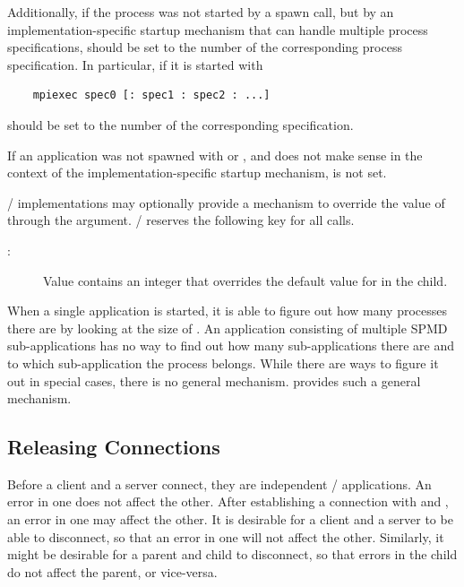 Additionally, if the process was not started by a spawn call,
but by an implementation-specific startup mechanism that can
handle multiple process specifications,  should
be set to the number of the corresponding process specification.
In particular, if it is started with
\begin{verbatim}
    mpiexec spec0 [: spec1 : spec2 : ...]
\end{verbatim}
 should be set to the number of the corresponding
specification.

If an application was not spawned with  or
, and 
does not
make sense in the context of the implementation-specific
startup mechanism,  is not set.

\MPI/ implementations may optionally provide a mechanism to
override the value of  through the
 argument. \MPI/ reserves the following key
for all  calls.

\begin{description}
\item[:] Value contains an integer that overrides
the default value for  in the child.
\end{description}


\begin{rationale}
When a single application is started, it is able to figure
out how many processes there are by looking at the
size of .  An application
consisting of multiple SPMD sub-applications has no
way to find out how many sub-applications there are
and to which sub-application the process belongs. While there
are ways to figure it out in special cases, there
is no general mechanism.  provides
such a general mechanism.
\end{rationale}





\subsection{Releasing Connections}
\label{subsec:disconnect}
Before a client and a server connect, they are independent
\MPI/ applications. An error in one does not affect the other.
After establishing a connection with 
and , an error in one may
affect the other.
It is desirable for a client and a server to be
able to disconnect, so that an error in one will
not affect the other. Similarly, it might be desirable for
a parent and child to disconnect, so that errors
in the child do not affect the parent, or vice-versa.

